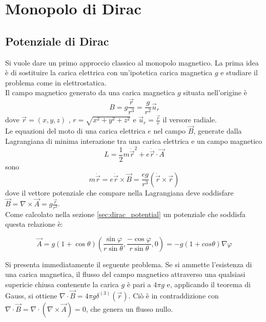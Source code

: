 \chapter{Monopolo di Dirac}\label{cap:diracmonopole}
\section{Potenziale di Dirac}
Si vuole dare un primo approccio classico al monopolo magnetico.
La prima idea è di sostituire la carica elettrica con un'ipotetica carica magnetica
$g$ e studiare il problema come in elettrostatica.\\
Il campo magnetico generato da una carica magnetica $g$ situata nell'origine è
%
\begin{equation}\label{eq:monopolefield}
   B = g \frac{\vec r}{r^3} = \frac{g}{r^2} \vec u _r
\end{equation}
%
dove $\vec r = (x,y,z)$ , $r = \sqrt{x^2 + y^2 + z^2}$ e $\vec u _r = \frac{\vec r}{r}$
il versore radiale.\\
Le equazioni del moto di una carica elettrica $e$ nel campo $\vec B$,
generate dalla Lagrangiana di minima interazione tra una carica elettrica e un campo
magnetico
%
$$
   L = \frac{1}{2} m \dot{\vec r} ^2 + e \dot{\vec r} \cdot \vec A
$$
%
sono
%
$$
   m \ddot{\vec r} = e\dot{\vec r} \times \vec B =
      \frac{eg}{r^3}(\dot{\vec r} \times \vec r)
$$
%
dove il vettore potenziale che compare nella Lagrangiana deve soddisfare
$\vec B = \nabla \times \vec A = g \frac{\vec r}{r^3}$.\\

Come calcolato nella sezione \ref{sec:dirac_potential} un potenziale che soddisfa
questa relazione è:

\begin{equation}\label{eq:diracpotential}
  \vec A = g(1 + \cos\theta)\left( \frac{\sin\varphi}{r\sin\theta},
     \frac{-\cos\varphi}{r\sin\theta},0 \right) = - g (1+cos\theta) \nabla \varphi
\end{equation}

Si presenta immediatamente il seguente problema. Se si ammette l'esistenza di una carica
magnetica, il flusso del campo magnetico attraverso una qualsiasi supericie chiusa
contenente la carica $g$ è pari a $4\pi g$ e, applicando il teorema di Gauss,
si ottiene $\nabla \cdot \vec B = 4\pi g\delta^{(3)}(\vec r)$.
Ciò è in contraddizione con $\nabla \cdot \vec B = \nabla \cdot
(\nabla \times \vec A) = 0$, che genera un flusso nullo.

